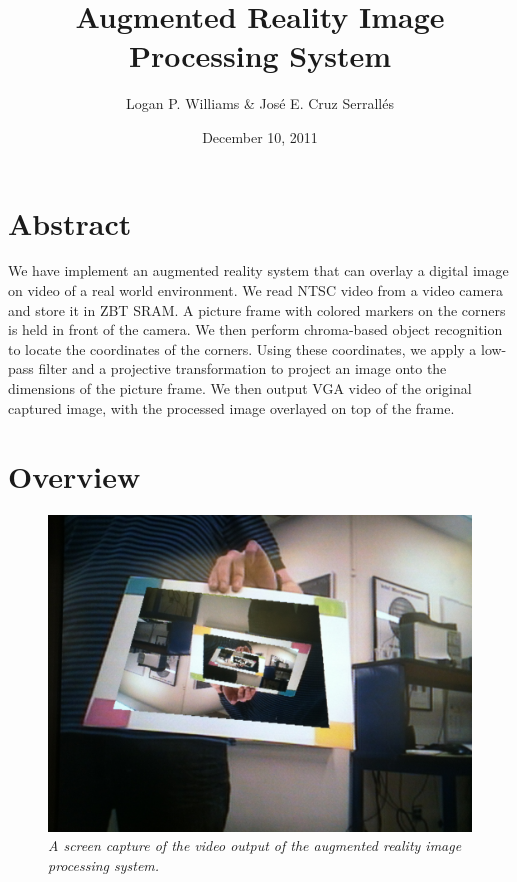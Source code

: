 \documentclass[10pt]{article}
\begin{document}
\title{Augmented Reality Image Processing System}
\author{Logan P. Williams \& Jos\'{e} E. Cruz Serrall\'{e}s}
\date{December 10, 2011}
\maketitle

\section*{Abstract}
We have implement an augmented reality system that can overlay a digital image on video of a real world environment. We read NTSC video from a video camera and store it in ZBT SRAM. A picture frame with colored markers on the corners is held in front of the camera. We then perform chroma-based object recognition to locate the coordinates of the corners. Using these coordinates, we apply a low-pass filter and a projective transformation to project an image onto the dimensions of the picture frame. We then output VGA video of the original captured image, with the processed image overlayed on top of the frame.

\newpage

\tableofcontents
\listoffigures

\newpage

\section{Overview}

\begin{figure}[h!]
\centering
\includegraphics[width=\textwidth]{images/IMG_0113.jpg}
\caption{\emph{A screen capture of the video output of the augmented reality image processing system.}}
\end{figure}
\end{document}
